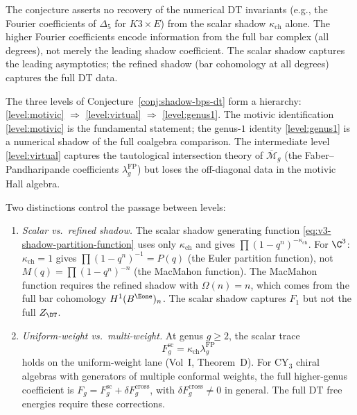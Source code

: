\begin{conjecture}
The conjecture asserts no recovery of the numerical DT invariants (e.g., the Fourier coefficients of $\Delta_5$ for $K3 \times E$) from the scalar shadow $\kappa_{\mathrm{ch}}$ alone. The higher Fourier coefficients encode information from the full bar complex (all degrees), not merely the leading shadow coefficient. The scalar shadow captures the leading asymptotics; the refined shadow (bar cohomology at all degrees) captures the full DT data.
\end{conjecture}


\begin{remark}
\label{rem:dt-shadow-level}
The three levels of Conjecture~\ref{conj:shadow-bps-dt} form a hierarchy: \ref{level:motivic} $\Rightarrow$ \ref{level:virtual} $\Rightarrow$ \ref{level:genus1}. The motivic identification \ref{level:motivic} is the fundamental statement; the genus-$1$ identity \ref{level:genus1} is a numerical shadow of the full coalgebra comparison. The intermediate level \ref{level:virtual} captures the tautological intersection theory of $\overline{\mathcal{M}}_g$ (the Faber--Pandharipande coefficients $\lambda_g^{\mathrm{FP}}$) but loses the off-diagonal data in the motivic Hall algebra.

Two distinctions control the passage between levels:
\begin{enumerate}[label=\textup{(\roman*)}]
\item \emph{Scalar vs.\ refined shadow.} The scalar shadow generating function \eqref{eq:v3-shadow-partition-function} uses only $\kappa_{\mathrm{ch}}$ and gives $\prod (1-q^n)^{-\kappa_{\mathrm{ch}}}$. For $\C^3$: $\kappa_{\mathrm{ch}} = 1$ gives $\prod (1-q^n)^{-1} = P(q)$ (the Euler partition function), not $M(q) = \prod (1-q^n)^{-n}$ (the MacMahon function). The MacMahon function requires the refined shadow with $\Omega(n) = n$, which comes from the full bar cohomology $H^1(B^{\Eone})_n$. The scalar shadow captures $F_1$ but not the full $Z_{\DT}$.
\item \emph{Uniform-weight vs.\ multi-weight.} At genus $g \geq 2$, the scalar trace
\[
 F_g^{\mathrm{sc}}=\kappa_{\mathrm{ch}}\lambda_g^{\mathrm{FP}}
\]
holds on the uniform-weight lane (Vol~I, Theorem~D). For CY$_3$ chiral algebras with generators of multiple conformal weights, the full higher-genus coefficient is \(F_g=F_g^{\mathrm{sc}}+\delta F_g^{\mathrm{cross}}\), with \(\delta F_g^{\mathrm{cross}} \neq 0\) in general. The full DT free energies require these corrections.
\end{enumerate}
\end{remark}


